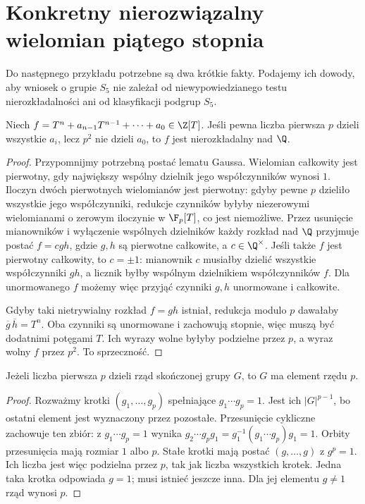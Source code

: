 \section{Konkretny nierozwiązalny wielomian piątego stopnia}

Do następnego przykładu potrzebne są dwa krótkie fakty. Podajemy ich dowody, aby wniosek o grupie $S_5$ nie zależał od niewypowiedzianego testu nierozkładalności ani od klasyfikacji podgrup $S_5$.

\begin{lemat}
Niech $f=T^n+a_{n-1}T^{n-1}+\cdots+a_0\in\Z[T]$. Jeśli pewna liczba pierwsza $p$ dzieli wszystkie $a_i$, lecz $p^2$ nie dzieli $a_0$, to $f$ jest nierozkładalny nad $\Q$.
\end{lemat}
\begin{proof}
Przypomnijmy potrzebną postać lematu Gaussa. Wielomian całkowity jest pierwotny, gdy największy wspólny dzielnik jego współczynników wynosi $1$. Iloczyn dwóch pierwotnych wielomianów jest pierwotny: gdyby pewne $p$ dzieliło wszystkie jego współczynniki, redukcje czynników byłyby niezerowymi wielomianami o zerowym iloczynie w $\F_p[T]$, co jest niemożliwe. Przez usunięcie mianowników i wyłączenie wspólnych dzielników każdy rozkład nad $\Q$ przyjmuje postać $f=cgh$, gdzie $g,h$ są pierwotne całkowite, a $c\in\Q^\times$. Jeśli także $f$ jest pierwotny całkowity, to $c=\pm1$: mianownik $c$ musiałby dzielić wszystkie współczynniki $gh$, a licznik byłby wspólnym dzielnikiem współczynników $f$. Dla unormowanego $f$ możemy więc przyjąć czynniki $g,h$ unormowane i całkowite.

Gdyby taki nietrywialny rozkład $f=gh$ istniał, redukcja modulo $p$ dawałaby $\overline g\,\overline h=T^n$. Oba czynniki są unormowane i zachowują stopnie, więc muszą być dodatnimi potęgami $T$. Ich wyrazy wolne byłyby podzielne przez $p$, a wyraz wolny $f$ przez $p^2$. To sprzeczność.
\end{proof}

\begin{lemat}
Jeżeli liczba pierwsza $p$ dzieli rząd skończonej grupy $G$, to $G$ ma element rzędu $p$.
\end{lemat}
\begin{proof}
Rozważmy krotki $(g_1,\dots,g_p)$ spełniające $g_1\cdots g_p=1$. Jest ich $|G|^{p-1}$, bo ostatni element jest wyznaczony przez pozostałe. Przesunięcie cykliczne zachowuje ten zbiór: z $g_1\cdots g_p=1$ wynika $g_2\cdots g_pg_1=g_1^{-1}(g_1\cdots g_p)g_1=1$. Orbity przesunięcia mają rozmiar $1$ albo $p$. Stałe krotki mają postać $(g,\dots,g)$ z $g^p=1$. Ich liczba jest więc podzielna przez $p$, tak jak liczba wszystkich krotek. Jedna taka krotka odpowiada $g=1$; musi istnieć jeszcze inna. Dla jej elementu $g\ne1$ rząd wynosi $p$.
\end{proof}

